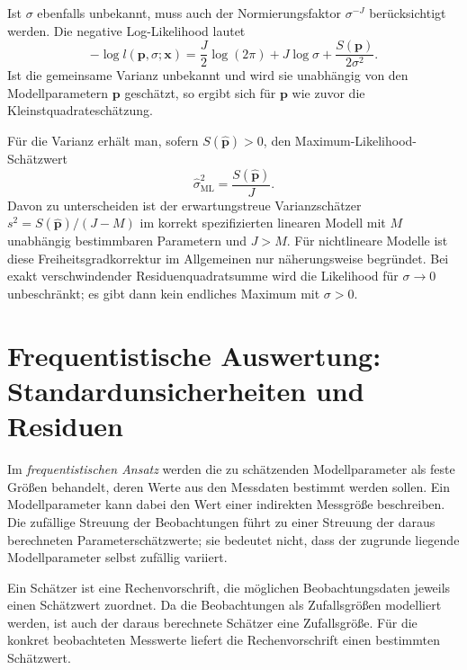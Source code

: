 Ist $\sigma$ ebenfalls unbekannt, muss auch der Normierungsfaktor
$\sigma^{-J}$ berücksichtigt werden. Die negative Log-Likelihood lautet
\begin{equation}
-\log l(\mathbf{p},\sigma;\mathbf{x})
=\frac{J}{2}\log(2\pi)+J\log\sigma
+\frac{S(\mathbf{p})}{2\sigma^2}.
\label{KonzepteNegLogL}
\end{equation}
Ist die gemeinsame Varianz unbekannt und wird sie unabhängig von
den Modellparametern $\mathbf{p}$ geschätzt, so ergibt sich für
$\mathbf{p}$ wie zuvor die Kleinstquadrateschätzung.

Für die Varianz erhält man, sofern $S(\widehat{\mathbf{p}})>0$,
den Maximum-Likelihood-Schätzwert
\begin{equation}
\widehat{\sigma}_{\mathrm{ML}}^2
=\frac{S(\widehat{\mathbf{p}})}{J}.
\end{equation}
Davon zu unterscheiden ist der erwartungstreue Varianzschätzer
$s^2=S(\widehat{\mathbf{p}})/(J-M)$ im korrekt spezifizierten linearen
Modell mit $M$ unabhängig bestimmbaren Parametern und $J>M$.
Für nichtlineare Modelle ist diese Freiheitsgradkorrektur im Allgemeinen
nur näherungsweise begründet. Bei exakt verschwindender
Residuenquadratsumme wird die Likelihood für $\sigma\to0$ unbeschränkt;
es gibt dann kein endliches Maximum mit $\sigma>0$.

\section{Frequentistische Auswertung: Standardunsicherheiten und Residuen}
\label{V4Frequentistisch}

Im \textsl{frequentistischen Ansatz} werden die zu schätzenden
Modellparameter als feste Größen behandelt, deren Werte aus den
Messdaten bestimmt werden sollen. Ein Modellparameter kann dabei
den Wert einer indirekten Messgröße beschreiben.
Die zufällige Streuung der Beobachtungen führt zu einer Streuung
der daraus berechneten Parameterschätzwerte; sie bedeutet nicht,
dass der zugrunde liegende Modellparameter selbst zufällig variiert.

Ein Schätzer ist eine Rechenvorschrift, die möglichen Beobachtungsdaten
jeweils einen Schätzwert zuordnet. Da die Beobachtungen als
Zufallsgrößen modelliert werden, ist auch der daraus berechnete
Schätzer eine Zufallsgröße. Für die konkret beobachteten Messwerte
liefert die Rechenvorschrift einen bestimmten Schätzwert.

